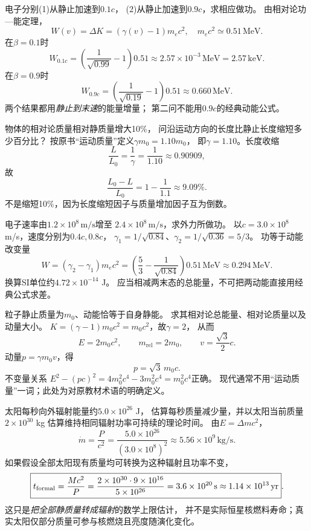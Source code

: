 \problemtext 电子分别(1)从静止加速到$0.1c$，
(2)从静止加速到$0.9c$，求相应做功。
\workings
由相对论功—能定理，
\[
W(v)=\Delta K=(\gamma(v)-1)m_ec^2,
\quad m_ec^2\simeq0.51\,\mathrm{MeV}.
\]
在$\beta=0.1$时
\[
\boxed{W_{0.1c}=
\left(\frac1{\sqrt{0.99}}-1\right)0.51
\approx2.57\times10^{-3}\,\mathrm{MeV}
=2.57\,\mathrm{keV}}.
\]
在$\beta=0.9$时
\[
\boxed{W_{0.9c}=
\left(\frac1{\sqrt{0.19}}-1\right)0.51
\approx0.660\,\mathrm{MeV}}.
\]
\crosscheck 两个结果都用\emph{静止到末速}的能量增量；
第二问不能用$0.9c$的经典动能公式。

\problemtext 物体的相对论质量相对静质量增大10\%，
问沿运动方向的长度比静止长度缩短多少百分比？
\workings
按原书“运动质量”定义$\gamma m_0=1.10m_0$，
即$\gamma=1.10$。长度收缩
\[
\frac{L}{L_0}=\frac1\gamma=\frac1{1.10}
\approx0.90909,
\]
故
\[
\boxed{\frac{L_0-L}{L_0}=1-\frac1{1.1}
\approx9.09\%}.
\]
\crosscheck 不是缩短10\%，因为长度缩短因子与质量增加因子互为倒数。

\problemtext 电子速率由$1.2\times10^8\,\mathrm{m/s}$增至
$2.4\times10^8\,\mathrm{m/s}$，求外力所做功。
\workings
以$c=3.0\times10^8$ m/s，速度分别为$0.4c,0.8c$，
$\gamma_1=1/\sqrt{0.84}$、$\gamma_2=1/\sqrt{0.36}=5/3$。
功等于动能改变量
\[
\boxed{W=(\gamma_2-\gamma_1)m_ec^2
=\left(\frac53-\frac1{\sqrt{0.84}}\right)0.51\,\mathrm{MeV}
\approx0.294\,\mathrm{MeV}}.
\]
换算SI单位约$4.72\times10^{-14}$ J。
\crosscheck 应当相减两末态的总能量，不可把两动能直接用经典公式求差。

\problemtext 粒子静止质量为$m_0$、动能恰等于自身静能。
求其相对论总能量、相对论质量以及动量大小。
\workings
$K=(\gamma-1)m_0c^2=m_0c^2$，故$\gamma=2$，
从而
\[
\boxed{E=2m_0c^2},\qquad
\boxed{m_{\mathrm{rel}}=2m_0},\qquad
\boxed{v=\frac{\sqrt3}{2}c}.
\]
动量$p=\gamma m_0v$，得
\[
\boxed{p=\sqrt3\,m_0c}.
\]
\crosscheck 不变量关系
$E^2-(pc)^2=4m_0^2c^4-3m_0^2c^4=m_0^2c^4$正确。
现代通常不用“运动质量”一词；此处为对原教材术语的明确定义。

\problemtext 太阳每秒向外辐射能量约$5.0\times10^{26}$ J，
估算每秒质量减少量，并以太阳当前质量$2\times10^{30}$ kg
估算维持相同辐射功率可持续的理论时间。
\workings
由$E=\Delta mc^2$，
\[
\boxed{\dot m=\frac{P}{c^2}
=\frac{5.0\times10^{26}}{(3.0\times10^8)^2}
\approx5.56\times10^9\,\mathrm{kg/s}}.
\]
如果假设全部太阳现有质量均可转换为这种辐射且功率不变，
\[
\boxed{t_{\rm formal}=\frac{Mc^2}{P}
=\frac{2\times10^{30}\cdot9\times10^{16}}{5\times10^{26}}
=3.6\times10^{20}\,\mathrm s\approx1.14\times10^{13}\,\mathrm{yr}}.
\]
\crosscheck 这只是\emph{把全部静质量转成辐射}的数学上限估计，
并不是实际恒星核燃料寿命；真实太阳仅部分质量可参与核燃烧且亮度随演化变化。

